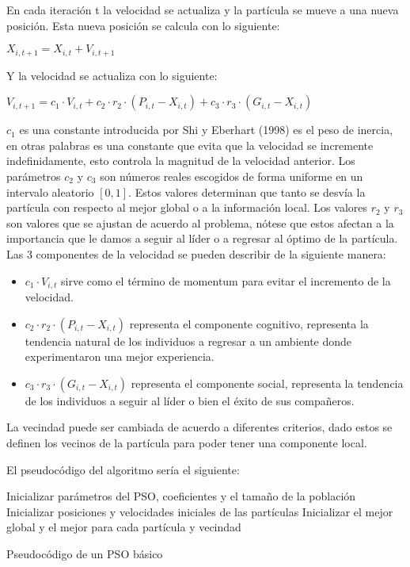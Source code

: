 \documentclass[11pt,letterpaper]{article}
\begin{document}
En cada iteración t la velocidad se actualiza y la partícula se mueve a una nueva posición. Esta nueva posición se calcula con lo siguiente:

$X_{i,t+1} = X_{i,t} + V_{i,t+1}$

Y la velocidad se actualiza con lo siguiente:

$V_{i,t+1} = c_1\cdot V_{i,t} + c_2\cdot r_2 \cdot (P_{i,t} - X_{i,t}) + c_3 \cdot r_3 \cdot (G_{i,t} - X_{i,t})$

$c_1$ es una constante introducida por Shi y Eberhart (1998) es el peso de inercia, en otras palabras es una constante que evita que la velocidad se incremente indefinidamente, esto controla la magnitud de la velocidad anterior. Los parámetros $c_2$ y $c_3$ son números reales escogidos de forma uniforme en un intervalo aleatorio $\left [ 0,1   \right ]$. Estos valores determinan que tanto se desvía la partícula con respecto al mejor global o a la información local. Los valores $r_2$ y $r_3$ son valores que se ajustan de acuerdo al problema, nótese que estos afectan a la importancia que le damos a seguir al líder o a regresar al óptimo de la partícula. Las 3 componentes de la velocidad se pueden describir de la siguiente manera: 

\begin{itemize}
	\item $c_1\cdot V_{i,t}$ sirve como el término de momentum para evitar el incremento de la velocidad.
	\item $c_2\cdot r_2 \cdot (P_{i,t} - X_{i,t})$ representa el componente cognitivo, representa la tendencia natural de los individuos a regresar a un ambiente donde experimentaron una mejor experiencia.
	\item $c_3 \cdot r_3 \cdot (G_{i,t} - X_{i,t})$ representa el componente social, representa la tendencia de los individuos a seguir al líder o bien el éxito de sus compañeros.
\end{itemize}

La vecindad puede ser cambiada de acuerdo a diferentes criterios, dado estos se definen los vecinos de la partícula para poder tener una componente local.

El pseudocódigo del algoritmo sería el siguiente: 

\begin{algorithm}[H]
	\KwData{}
	\KwResult{}
	Inicializar parámetros del PSO, coeficientes y el tamaño de la población\;
	Inicializar posiciones y velocidades iniciales de las partículas\;
	Inicializar el mejor global y el mejor para cada partícula y vecindad\;
	\caption{Pseudocódigo de un PSO básico}
\end{algorithm}
\end{document}

